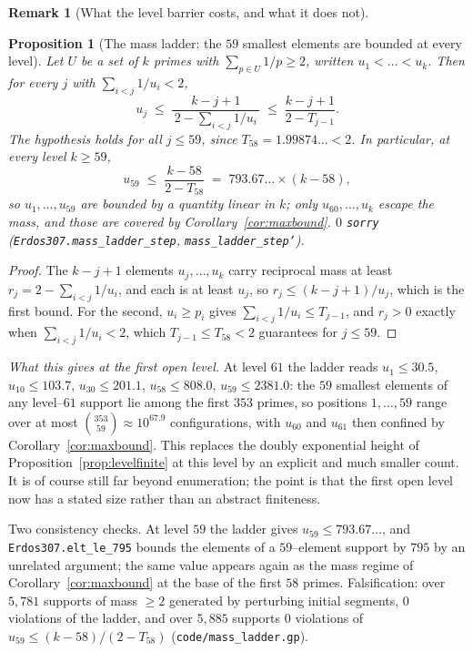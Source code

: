 \documentclass[11pt]{article}
\newtheorem{proposition}[theorem]{Proposition}
\theoremstyle{definition}
\newtheorem{remark}[theorem]{Remark}
\begin{document}
\begin{remark}[What the level barrier costs, and what it does not]
\begin{proposition}[The mass ladder: the $59$ smallest elements are bounded at every level]\label{prop:massladder}
Let $U$ be a set of $k$ primes with $\sum_{p\in U}1/p\ge2$, written $u_1<\dots<u_k$. Then for every
$j$ with $\sum_{i<j}1/u_i<2$,
\[ u_j\;\le\;\frac{k-j+1}{\,2-\sum_{i<j}1/u_i\,}\;\le\;\frac{k-j+1}{2-T_{j-1}} . \]
The hypothesis holds for all $j\le59$, since $T_{58}=1.99874\ldots<2$. In particular, at every level
$k\ge59$,
\[ u_{59}\;\le\;\frac{k-58}{2-T_{58}}\;=\;793.67\ldots\times(k-58), \]
so $u_1,\dots,u_{59}$ are bounded by a quantity linear in $k$; only $u_{60},\dots,u_k$ escape the
mass, and those are covered by Corollary~\ref{cor:maxbound}. $0$ \texttt{sorry}
\textup{(\texttt{Erdos307.mass\_ladder\_step}, \texttt{mass\_ladder\_step'})}.
\end{proposition}
\begin{proof}
The $k-j+1$ elements $u_j,\dots,u_k$ carry reciprocal mass at least $r_j=2-\sum_{i<j}1/u_i$, and
each is at least $u_j$, so $r_j\le(k-j+1)/u_j$, which is the first bound. For the second,
$u_i\ge p_i$ gives $\sum_{i<j}1/u_i\le T_{j-1}$, and $r_j>0$ exactly when $\sum_{i<j}1/u_i<2$,
which $T_{j-1}\le T_{58}<2$ guarantees for $j\le59$.
\end{proof}

\emph{What this gives at the first open level.} At level $61$ the ladder reads $u_1\le30.5$, $u_{10}\le103.7$, $u_{30}\le201.1$, $u_{58}\le808.0$,
$u_{59}\le2381.0$: the $59$ smallest elements of any level--$61$ support lie among the first $353$
primes, so positions $1,\dots,59$ range over at most $\binom{353}{59}\approx10^{67.9}$
configurations, with $u_{60}$ and $u_{61}$ then confined by
Corollary~\ref{cor:maxbound}. This replaces the doubly exponential height of
Proposition~\ref{prop:levelfinite} at this level by an explicit and much smaller count. It is of
course still far beyond enumeration; the point is that the first open level now has a stated size
rather than an abstract finiteness.

Two consistency checks. At level $59$ the ladder gives $u_{59}\le793.67\ldots$, and
\texttt{Erdos307.elt\_le\_795} bounds the elements of a $59$--element support by $795$ by an
unrelated argument; the same value appears again as the mass regime of
Corollary~\ref{cor:maxbound} at the base of the first $58$ primes. Falsification: over $5{,}781$
supports of mass $\ge2$ generated by perturbing initial segments, $0$ violations of the ladder, and
over $5{,}885$ supports $0$ violations of $u_{59}\le(k-58)/(2-T_{58})$
\textup{(\texttt{code/mass\_ladder.gp})}.



\end{remark}
\end{document}
